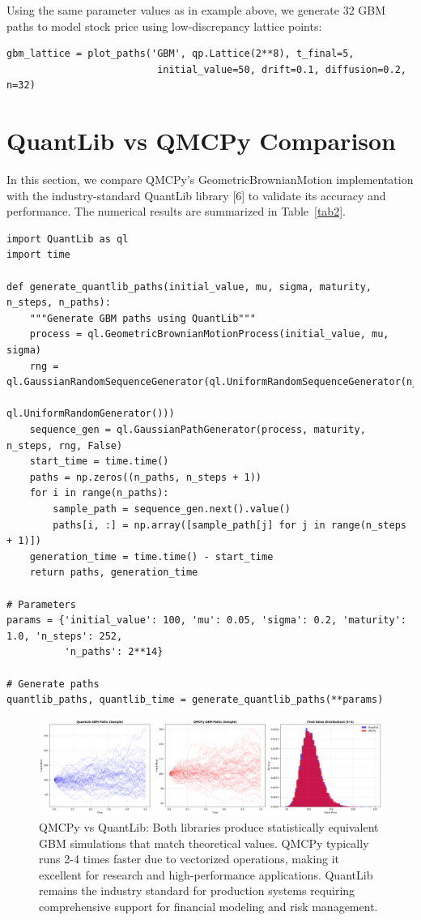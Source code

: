 \documentclass{article}
\begin{document}
Using the same parameter values as in example above, we generate 32 GBM paths to model stock price using low-discrepancy lattice points:

\begin{verbatim}
gbm_lattice = plot_paths('GBM', qp.Lattice(2**8), t_final=5, 
                          initial_value=50, drift=0.1, diffusion=0.2, n=32)
\end{verbatim}



\section{QuantLib vs QMCPy Comparison}

In this section, we compare QMCPy's GeometricBrownianMotion implementation with the industry-standard QuantLib library [6] to validate its accuracy and performance. The numerical results are summarized in Table~\ref{tab2}.


\begin{verbatim}
import QuantLib as ql
import time

def generate_quantlib_paths(initial_value, mu, sigma, maturity, n_steps, n_paths):
    """Generate GBM paths using QuantLib"""
    process = ql.GeometricBrownianMotionProcess(initial_value, mu, sigma)
    rng = ql.GaussianRandomSequenceGenerator(ql.UniformRandomSequenceGenerator(n_steps, 
                                             ql.UniformRandomGenerator()))
    sequence_gen = ql.GaussianPathGenerator(process, maturity, n_steps, rng, False)
    start_time = time.time()
    paths = np.zeros((n_paths, n_steps + 1))
    for i in range(n_paths):
        sample_path = sequence_gen.next().value()
        paths[i, :] = np.array([sample_path[j] for j in range(n_steps + 1)])
    generation_time = time.time() - start_time
    return paths, generation_time

# Parameters
params = {'initial_value': 100, 'mu': 0.05, 'sigma': 0.2, 'maturity': 1.0, 'n_steps': 252, 
          'n_paths': 2**14}

# Generate paths 
quantlib_paths, quantlib_time = generate_quantlib_paths(**params)
\end{verbatim}


\begin{figure}[t!]
\centering
\includegraphics[width=1\textwidth]{images/figure_5.png}
\caption{QMCPy vs QuantLib: Both libraries produce statistically equivalent GBM simulations that match theoretical values. QMCPy typically runs 2-4 times faster due to vectorized operations, making it excellent for research and high-performance applications. QuantLib remains the industry standard for production systems requiring comprehensive  support for financial modeling and risk management.}
\end{figure}
\end{document}
